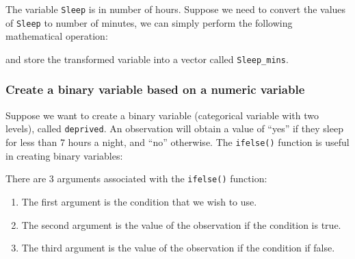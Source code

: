 \documentclass[
]{book}
\newenvironment{Shaded}{\begin{snugshade}}{\end{snugshade}}
\newcommand{\DecValTok}[1]{\textcolor[rgb]{0.00,0.00,0.81}{#1}}
\newcommand{\FunctionTok}[1]{\textcolor[rgb]{0.13,0.29,0.53}{\textbf{#1}}}
\newcommand{\NormalTok}[1]{#1}
\newcommand{\OtherTok}[1]{\textcolor[rgb]{0.56,0.35,0.01}{#1}}
\newcommand{\SpecialCharTok}[1]{\textcolor[rgb]{0.81,0.36,0.00}{\textbf{#1}}}
\newcommand{\StringTok}[1]{\textcolor[rgb]{0.31,0.60,0.02}{#1}}
\begin{document}
The variable \texttt{Sleep} is in number of hours. Suppose we need to convert the values of \texttt{Sleep} to number of minutes, we can simply perform the following mathematical operation:

\begin{Shaded}
\end{Shaded}

and store the transformed variable into a vector called \texttt{Sleep\_mins}.

\hypertarget{create-a-binary-variable-based-on-a-numeric-variable}{%
\subsubsection{Create a binary variable based on a numeric variable}\label{create-a-binary-variable-based-on-a-numeric-variable}}

Suppose we want to create a binary variable (categorical variable with two levels), called \texttt{deprived}. An observation will obtain a value of ``yes'' if they sleep for less than 7 hours a night, and ``no'' otherwise. The \texttt{ifelse()} function is useful in creating binary variables:

\begin{Shaded}
\end{Shaded}

There are 3 arguments associated with the \texttt{ifelse()} function:

\begin{enumerate}
\def\labelenumi{\arabic{enumi}.}
\item
  The first argument is the condition that we wish to use.
\item
  The second argument is the value of the observation if the condition is true.
\item
  The third argument is the value of the observation if the condition if false.
\end{enumerate}
\end{document}
